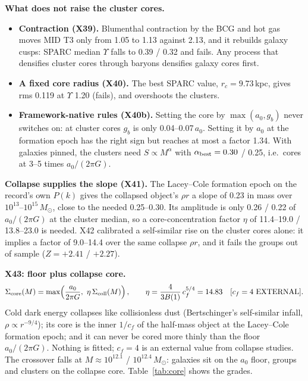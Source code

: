 \documentclass[10pt]{article}
\begin{document}
\textbf{What does not raise the cluster cores.}
\begin{itemize}
\item \textbf{Contraction (X39).} Blumenthal contraction by the BCG and hot gas moves MID T3 only from 1.05 to 1.13 against 2.13, and it rebuilds galaxy cusps: SPARC median $\Upsilon$ falls to 0.39 / 0.32 and fails. Any process that densifies cluster cores through baryons densifies galaxy cores first.
\item \textbf{A fixed core radius (X40).} The best SPARC value, $r_c=9.73$\,kpc, gives rms 0.119 at $\Upsilon$ 1.20 (fails), and overshoots the clusters.
\item \textbf{Framework-native rules (X40b).} Setting the core by $\max(a_0,g_b)$ never switches on: at cluster cores $g_b$ is only 0.04--0.07\,$a_0$. Setting it by $a_0$ at the formation epoch has the right sign but reaches at most a factor 1.34. With galaxies pinned, the clusters need $S\propto M^{\alpha}$ with $\alpha_{\rm best}=0.30$ / 0.25, i.e.\ cores at 3--5 times $a_0/(2\pi G)$.
\end{itemize}

\textbf{Collapse supplies the slope (X41).} The Lacey--Cole formation epoch on the record's own $P(k)$ gives the collapsed object's $\rho r$ a slope of 0.23 in mass over $10^{13}$--$10^{15}\,M_\odot$, close to the needed 0.25--0.30. Its amplitude is only 0.26 / 0.22 of $a_0/(2\pi G)$ at the cluster median, so a core-concentration factor $\eta$ of 11.4--19.0 / 13.8--23.0 is needed. X42 calibrated a self-similar rise on the cluster cores alone: it implies a factor of 9.0--14.4 over the same collapse $\rho r$, and it fails the groups out of sample ($Z=+2.41$ / $+2.27$).

\textbf{X43: floor plus collapse core.}
\[
\Sigma_{\rm core}(M)=\max\!\left(\frac{a_0}{2\pi G},\ \eta\,\Sigma_{\rm coll}(M)\right),\qquad \eta=\frac{4}{3B(1)}\,c_f^{5/4}=14.83\quad[c_f=4\ \text{EXTERNAL}].
\]
Cold dark energy collapses like collisionless dust (Bertschinger's self-similar infall, $\rho\propto r^{-9/4}$); its core is the inner $1/c_f$ of the half-mass object at the Lacey--Cole formation epoch; and it can never be cored more thinly than the floor $a_0/(2\pi G)$. Nothing is fitted; $c_f=4$ is an external value from collapse studies. The crossover falls at $M\approx10^{12.1}$ / $10^{12.4}\,M_\odot$: galaxies sit on the $a_0$ floor, groups and clusters on the collapse core. Table~\ref{tab:core} shows the grades.
\end{document}
